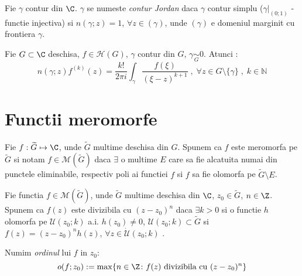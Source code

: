 \begin{definition}
    Fie $\gamma$ contur din $\C$. $\gamma$ se numeste \emph{contur Jordan} daca
    $\gamma$ contur simplu ($\gamma|_{(0;1)}$ - functie injectiva) si $n(\gamma;z) = 1$,
    $\forall z \in (\gamma)$, unde $(\gamma)$ e domeniul marginit cu frontiera $\gamma$.
\end{definition}

\begin{theorem}
    Fie $G \subset \C$ deschisa, $f \in \mathcal{H}(G)$, $\gamma$ contur din $G$,
    $\gamma \underset{G}{\sim} 0$. Atunci :
    \begin{equation}
        n(\gamma;z) f^{(k)}(z) = \frac{k!}{2 \pi i} \int_{\gamma} \frac{f(\xi)}{(\xi-z)^{k+1}}
        \;,\; \forall z \in G \setminus \{\gamma\} \;,\; k \in \mathbb{N}
    \end{equation}
\end{theorem}

\section{Functii meromorfe}

\begin{definition}
    Fie $f : \widetilde{G} \mapsto \C$, unde $\widetilde{G}$ multime deschisa din $G$.
    Spunem ca $f$ este meromorfa pe $\widetilde{G}$ si notam $f\in \mathcal{M}(\widetilde{G})$ daca
    $\exists$ o multime $E$ care sa fie alcatuita numai din punctele eliminabile, respectiv poli
    ai functiei $f$ si $f$ sa fie olomorfa pe $\widetilde{G} \setminus E$.
\end{definition}

\begin{definition}
    Fie functia $f \in \mathcal{M}(\widetilde{G})$, unde $\widetilde{G}$ multime deschisa
    din  $\C$, $z_0 \in \widetilde{G}$, $n \in \Z$. Spunem ca $f(z)$ este divizibila cu
    $(z-z_0)^n$ daca $\exists k >0$ si o functie $h$ olomorfa pe $\mathcal{U}(z_0;k)$ a.i.
    $h(z_0) \neq 0$, $\mathcal{U}(z_0;k) \subset \widetilde{G}$ si
    $f(z) = (z-z_0)^n h(z)$, $\forall z \in \dot{\mathcal{U}}(z_0;k)$ .
\end{definition}

\begin{definition}
    Numim \emph{ordinul} lui $f$ in $z_0$:
    \begin{equation}
        o (f;z_0) := \max \{n \in \Z \colon f(z) \text{ divizibila cu } (z-z_0)^n \}
    \end{equation}
\end{definition}

